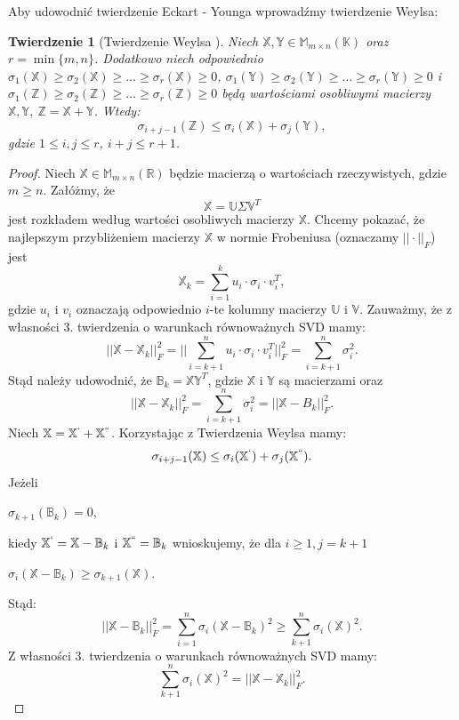 \documentclass[12pt,a4paper]{report}
\newtheorem{tw}[df]{Twierdzenie}
\newcommand{\setR}{\mathbb{R}}
\newcommand{\setK}{\mathbb{K}}
\begin{document}
Aby udowodnić twierdzenie Eckart - Younga wprowadźmy twierdzenie Weylsa:

\begin{tw}[Twierdzenie Weylsa {\citep{wayls}}]
Niech $\mathbb{X}, \mathbb{Y} \in \mathbb{M}_{m \times n}(\setK)$ oraz $r=\min\{m,n\}$.
Dodatkowo niech odpowiednio $\sigma_1(\mathbb{X}) \geq \sigma_2(\mathbb{X})\geq \ldots \geq \sigma_r(\mathbb{X})\geq 0$, $\sigma_1(\mathbb{Y}) \geq \sigma_2(\mathbb{Y})\geq \ldots \geq \sigma_r(\mathbb{Y})\geq 0$ i $\sigma_1(\mathbb{Z}) \geq \sigma_2(\mathbb{Z})\geq \ldots \geq \sigma_r(\mathbb{Z})\geq 0$ będą wartościami osobliwymi macierzy $\mathbb{X}, \mathbb{Y}, \: \mathbb{Z}=\mathbb{X} + \mathbb{Y}$. Wtedy:
$$
\sigma_{i+j-1}(\mathbb{Z}) \leq \sigma_i(\mathbb{X}) + \sigma_j(\mathbb{Y}),
$$
gdzie $1 \leq i,j \leq r$, $i+j\leq r+1$.
\end{tw}


\begin{proof}
Niech $\mathbb{X} \in \mathbb{M}_{m\times n}(\setR)$ będzie macierzą o wartościach rzeczywistych, gdzie $m\geq n$.
Załóżmy, że
$$
\mathbb{X}=\mathbb{U} \Sigma \mathbb{V}^T
$$
jest rozkładem według wartości osobliwych macierzy $\mathbb{X}$.
Chcemy pokazać, że najlepszym przybliżeniem macierzy $\mathbb{X}$ w normie Frobeniusa (oznaczamy $||\cdot||_F$) jest
$$
\mathbb{X}_k = \sum_{i=1}^k u_i\cdot \sigma_i \cdot v_i^T,
$$
gdzie $u_i$ i $v_i$ oznaczają odpowiednio $i$-te kolumny macierzy $\mathbb{U}$ i $\mathbb{V}$.
Zauważmy, że z własności 3. twierdzenia o warunkach równoważnych SVD mamy:
$$
||\mathbb{X} - \mathbb{X}_k||_F^2 = ||\sum_{i=k+1}^n u_i \cdot \sigma_i \cdot v_i^T||_F^2 = \sum_{i=k+1}^n \sigma_i^2.
$$
Stąd należy udowodnić, że $\mathbb{B}_k = \mathbb{X}\mathbb{Y}^T$, gdzie $\mathbb{X}$ i $\mathbb{Y}$ są macierzami oraz 
$$
||\mathbb{X} - \mathbb{X}_k||_F^2 = \sum_{i=k+1}^n \sigma_i^2 = ||\mathbb{X} - B_k||_F^2.
$$
Niech $\mathbb{X} = \mathbb{X}^{`} + \mathbb{X}^{``}$. Korzystając z Twierdzenia Weylsa mamy:
$$
\sigma_{i+j-1}(\mathbb{X})\leq \sigma_{i}(\mathbb{X}^{`}) + \sigma_j(\mathbb{X}^{``}).
$$ 
Jeżeli 
\begin{center}
$\sigma_{k+1}(\mathbb{B}_k)=0$,
\end{center} 
kiedy $\mathbb{X}^{`} = \mathbb{X} - \mathbb{B}_k$ i $\mathbb{X}^{``} = \mathbb{B}_k$ wnioskujemy, że dla $i\geq 1, j= k+1$
\begin{center}
$\sigma_i(\mathbb{X}-\mathbb{B}_k)\geq \sigma_{k+1}(\mathbb{X})$.
\end{center}
Stąd:
$$
||\mathbb{X} - \mathbb{B}_k||_F^2 = \sum_{i=1}^n \sigma_i(\mathbb{X}-\mathbb{B}_k)^2\geq \sum_{k+1}^n \sigma_i(\mathbb{X})^2.
$$
Z własności 3. twierdzenia o warunkach równoważnych SVD mamy:
$$
\sum_{k+1}^n \sigma_i(\mathbb{X})^2 = ||\mathbb{X}-\mathbb{X}_k||_F^2.
$$
\end{proof}
\end{document}
